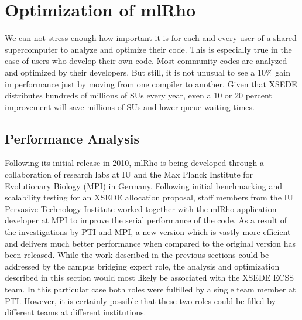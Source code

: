 \documentclass{sig-alternate}
\begin{document}
\section{Optimization of mlRho}\label{sec:optimization}
We can not stress enough how important it is for each and every user of a shared supercomputer to analyze and optimize their code. This is especially true in the case of users who develop their own code. Most community codes are analyzed and optimized by their developers. But still, it is not unusual to see a 10\% gain in performance just by moving from one compiler to another. Given that XSEDE distributes hundreds of millions of SUs every year, even a 10 or 20 percent improvement will save millions of SUs and lower queue waiting times. 

\subsection{Performance Analysis}\label{subsec:analysis}
Following its initial release in 2010\cite{MEC:MEC4482}, mlRho is being developed through a collaboration
 of research labs at IU and the Max Planck Institute for Evolutionary Biology (MPI) in Germany.
 Following initial benchmarking and scalability
testing for an XSEDE allocation proposal, staff members from the IU Pervasive Technology Institute worked
together with the mlRho application developer at MPI to improve the serial performance of the code. As a result of the investigations by PTI and MPI,  a new version which is vastly more efficient and delivers much better performance when compared to
the original version has been released. While the work described in the previous sections could be addressed by the campus
bridging expert role, the analysis and optimization described in this section would most likely be associated with
the XSEDE ECSS team. In this particular case both roles were fulfilled by a single team member at PTI. However,
it is certainly possible that these two roles could be filled by different teams at different institutions.
\end{document}
